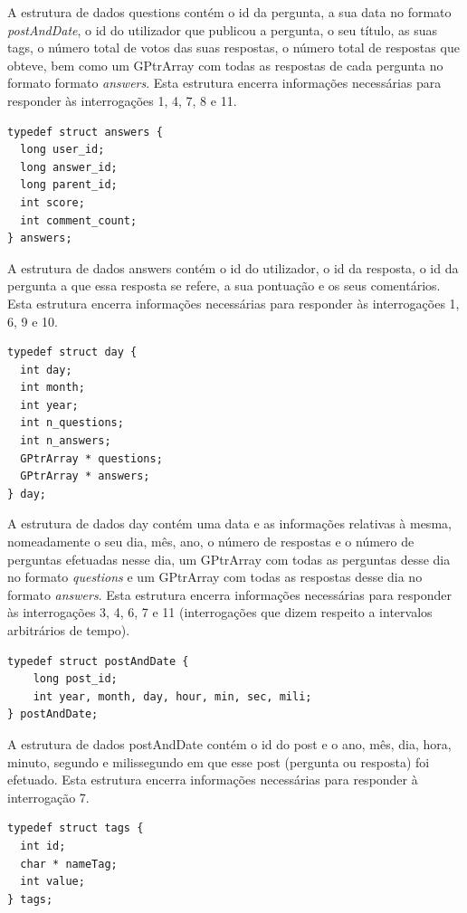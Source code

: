 \documentclass[a4paper]{article}
\begin{document}
A estrutura de dados questions contém o id da pergunta, a sua data no formato
\textit{postAndDate}, o id do utilizador que publicou a pergunta, o seu título,
as suas tags, o número total de votos das suas respostas, o número total de
respostas que obteve, bem como um GPtrArray com todas as respostas de cada
pergunta no formato formato \textit{answers}.
Esta estrutura encerra informações necessárias para responder às interrogações 1,
4, 7, 8 e 11.

\begin{verbatim}
typedef struct answers {
  long user_id;
  long answer_id;
  long parent_id;
  int score;
  int comment_count;
} answers;
\end{verbatim}

A estrutura de dados answers contém o id do utilizador, o id da resposta, o id da
pergunta a que essa resposta se refere, a sua pontuação e os seus comentários.
Esta estrutura encerra informações necessárias para responder às interrogações 1,
6, 9 e 10.

\begin{verbatim}
typedef struct day {
  int day;
  int month;
  int year;
  int n_questions;
  int n_answers;
  GPtrArray * questions;
  GPtrArray * answers;
} day;
\end{verbatim}

A estrutura de dados day contém uma data e as informações relativas à mesma,
nomeadamente o seu dia, mês, ano, o número de respostas e o
número de perguntas efetuadas nesse dia, um GPtrArray com todas as perguntas
desse dia no formato \textit{questions} e um GPtrArray com todas as respostas
desse dia no formato \textit{answers}. Esta estrutura encerra informações
necessárias para responder às interrogações 3, 4, 6, 7 e 11
(interrogações que dizem respeito a intervalos arbitrários de tempo).

\begin{verbatim}
typedef struct postAndDate {
    long post_id;
    int year, month, day, hour, min, sec, mili;
} postAndDate;
\end{verbatim}

A estrutura de dados postAndDate contém o id do post e o ano, mês, dia,
hora, minuto, segundo e milissegundo em que esse post
(pergunta ou resposta) foi efetuado. Esta estrutura encerra informações
necessárias para responder à interrogação 7.

\begin{verbatim}
typedef struct tags {
  int id;
  char * nameTag;
  int value;
} tags;
\end{verbatim}
\end{document}
